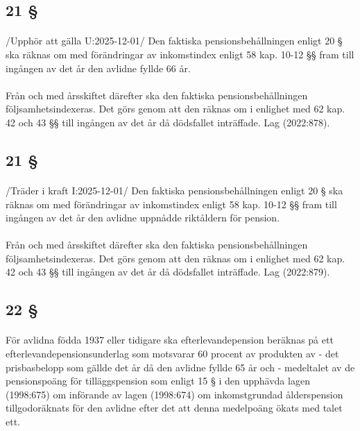 \documentclass[a4paper,notitlepage,openany,10pt]{book}
\begin{document}
\subsection*{21 §}
\paragraph*{}
/Upphör att gälla U:2025-12-01/
Den faktiska pensionsbehållningen enligt 20 § ska räknas om med förändringar av inkomstindex enligt 58 kap. 10-12 §§ fram till ingången av det år den avlidne fyllde 66 år.
\paragraph*{}
Från och med årsskiftet därefter ska den faktiska pensionsbehållningen följsamhetsindexeras. Det görs genom att den räknas om i enlighet med 62 kap. 42 och 43 §§ till ingången av det år då dödsfallet inträffade.
Lag (2022:878).
\subsection*{21 §}
\paragraph*{}
/Träder i kraft I:2025-12-01/
Den faktiska pensionsbehållningen enligt 20 § ska räknas om med förändringar av inkomstindex enligt 58 kap. 10-12 §§ fram till ingången av det år den avlidne uppnådde riktåldern för pension.
\paragraph*{}
Från och med årsskiftet därefter ska den faktiska pensionsbehållningen följsamhetsindexeras. Det görs genom att den räknas om i enlighet med 62 kap. 42 och 43 §§ till ingången av det år då dödsfallet inträffade.
Lag (2022:879).
\subsection*{22 §}
\paragraph*{}
För avlidna födda 1937 eller tidigare ska efterlevandepension beräknas på ett efterlevandepensionsunderlag som motsvarar 60 procent av produkten av
\newline - det prisbasbelopp som gällde det år då den avlidne fyllde 65 år och
\newline - medeltalet av de pensionspoäng för tilläggspension som enligt 15 § i den upphävda lagen (1998:675) om införande av lagen (1998:674) om inkomstgrundad ålderspension tillgodoräknats för den avlidne efter det att denna medelpoäng ökats med talet ett.
\end{document}
